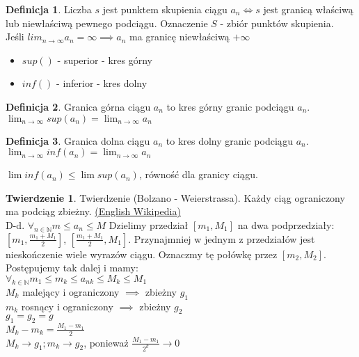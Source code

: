 \documentclass{article}
\theoremstyle{definition}
\newtheorem{de}{Definicja}[subsection]
\theoremstyle{definition}
\newtheorem{tw}{Twierdzenie}[subsection]
\theoremstyle{definition}
\theoremstyle{definition}
\begin{document}
\begin{de}
Liczba $s$ jest punktem skupienia ciągu $a_n\iff s$ jest granicą właściwą lub niewłaściwą pewnego podciągu.
Oznaczenie $S$ - zbiór punktów skupienia.\\

Jeśli $lim_{n\rightarrow \infty} a_n = \infty \implies a_n$ ma granicę niewłaściwą $+\infty$
\end{de}

\begin{itemize}
\item $sup()$ - superior - kres górny
\item $inf()$ - inferior - kres dolny
\end{itemize}

\begin{de}
Granica górna ciągu $a_n$ to kres górny granic podciągu $a_n$.\\
$\lim_{n\rightarrow \infty} sup(a_n) = \lim_{n\rightarrow\infty} a_n$
\end{de}

\begin{de}
Granica dolna ciągu $a_n$ to kres dolny granic podciągu $a_n$.\\
$\lim_{n\rightarrow \infty} inf(a_n) = \lim_{n\rightarrow\infty} a_n$
\end{de}

$\lim inf(a_n)\leq \lim sup(a_n)$, równość dla granicy ciągu.

\begin{tw}
Twierdzenie (Bolzano - Weierstrassa). Każdy ciąg ograniczony ma podciąg zbieżny.
\href{https://en.wikipedia.org/wiki/Bolzano%E2%80%93Weierstrass_theorem}{(English Wikipedia)}\\
D-d. $\forall_{n\in\mathbb{N}} m \leq a_n \leq M$ Dzielimy przedział $[m_1,M_1]$ na dwa podprzedziały:
$[m_1, \frac{m_1+M_1}{2}]$, $[\frac{m_1+M_1}{2},M_1]$. Przynajmniej w jednym z przedziałów jest nieskończenie wiele wyrazów ciągu.
Oznaczmy tę połówkę przez $[m_2, M_2]$. Postępujemy tak dalej i mamy:\\
$\forall_{k\in\mathbb{N}} m_1\leq m_k\leq a_{nk} \leq M_k \leq M_1$\\
$M_k$ malejący i ograniczony $\implies$ zbieżny $g_1$\\
$m_k$ rosnący i ograniczony $\implies$ zbieżny $g_2$\\
$g_1=g_2=g$\\
$M_k-m_k=\frac{M_1-m_1}{2}$\\
$M_k\rightarrow g_1; m_k\rightarrow g_2$, ponieważ $\frac{M_1-m_1}{2^k}\rightarrow 0$

\end{tw}
\end{document}

